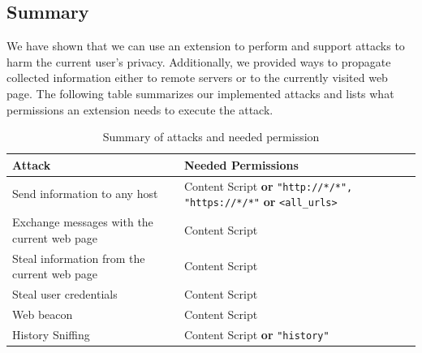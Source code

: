 	\subsection{Summary}
	
	We have shown that we can use an extension to perform and support attacks to harm the current user's privacy. Additionally, we provided ways to propagate collected information either to remote servers or to the currently visited web page. The following table summarizes our implemented attacks and lists what permissions an extension needs to execute the attack.
	
	\begin{table}[h]
		\centering
		\begin{tabular}{|l|l|} \hline
			\textbf{Attack} & \textbf{Needed Permissions} \\ \hline
			Send information to any host & Content Script \textbf{or} \texttt{"http://*/*", "https://*/*"} \textbf{or} \texttt{<all\_urls>} \\
			Exchange messages with the current web page & Content Script \\
			Steal information from the current web page & Content Script \\
			Steal user credentials & Content Script \\
			Web beacon & Content Script \\
			History Sniffing & Content Script \textbf{or} \texttt{"history"} \\ \hline
		\end{tabular}
		\caption{Summary of attacks and needed permission}
		\label{Summary of attacks and needed permission}
	\end{table}